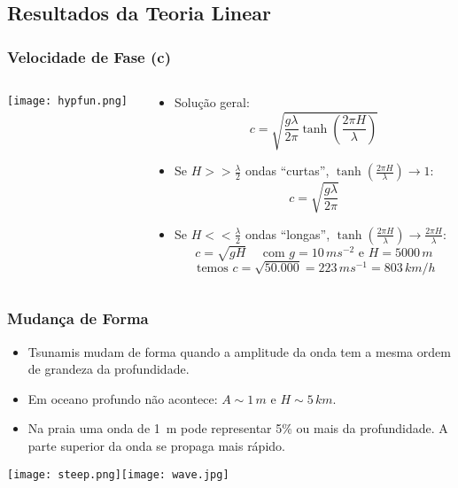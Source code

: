 \documentclass{beamer}
\begin{document}
\subsection{Resultados da Teoria Linear}
\begin{frame}
  \frametitle{Velocidade de Fase (c)}
  \begin{columns}
    \begin{column}{2.5cm}   
      \centerline{\texttt{[image: hypfun.png]}}
    \end{column}
    \begin{column}{9.5cm}
      \begin{itemize}\setlength{\itemsep}{1.5ex}
      \item Solução geral:
        \[c=\sqrt{\frac{g\lambda}{2\pi}\tanh\left(\frac{2\pi H}{\lambda}\right)}\]
      \item Se $H >> \frac{\lambda}{2}$ ondas ``curtas'',
        $\tanh\left(\frac{2\pi H}{\lambda}\right) \rightarrow 1$:
        \[c=\sqrt{\frac{g\lambda}{2\pi}}\]
      \item Se $H << \frac{\lambda}{2}$ ondas ``longas'',
        $\tanh\left(\frac{2\pi H}{\lambda}\right) \rightarrow \frac{2\pi
          H}{\lambda}$:\alert{
          \[c=\sqrt{gH}
          \quad \mbox{ com } g = 10\, ms^{-2} \mbox{ e } H = 5000\, m\]
          \[ \mbox{ temos } c=\sqrt{50.000} = 223\, ms^{-1} = 803\, km/h \]}
      \end{itemize}
    \end{column}    
  \end{columns}  
\end{frame}
\begin{frame}
  \frametitle{Mudança de Forma}
  \begin{itemize}\setlength{\itemsep}{1.5ex}
  \item Tsunamis mudam de forma quando a \alert{amplitude} da onda
    tem a mesma ordem de grandeza da \alert{profundidade}.
  \item Em oceano profundo não acontece: $A\sim 1\,m$ e
    $H\sim 5\,km$.
  \item Na praia uma onda de 1~m pode representar 5\% ou mais da
    profundidade. A parte superior da onda se propaga mais rápido.
  \end{itemize} 
  \texttt{[image: steep.png]}\texttt{[image: wave.jpg]}
\end{frame}
\end{document}
